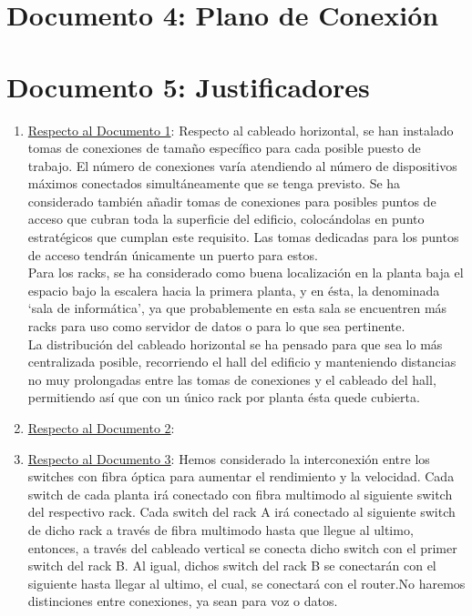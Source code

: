 \documentclass[]{article}
\begin{document}
\newpage

\section{Documento 4: Plano de Conexión}

\newpage

\section{Documento 5: Justificadores}

\begin{enumerate}[label=\alph*]
   \item \underline{Respecto al Documento 1}:
	Respecto al cableado horizontal, se han instalado tomas de conexiones de tamaño específico para cada posible puesto de trabajo. El número de conexiones varía atendiendo al número de dispositivos máximos conectados simultáneamente que se tenga previsto. Se ha considerado también añadir tomas de conexiones para posibles puntos de acceso que cubran toda la superficie del edificio, colocándolas en punto estratégicos que cumplan este requisito. Las tomas dedicadas para los puntos de acceso tendrán únicamente un puerto para estos. \\
	Para los racks, se ha  considerado como buena localización en la planta baja el espacio bajo la escalera hacia la primera planta, y en ésta, la denominada `sala de informática', ya que probablemente en esta sala se encuentren más racks para uso como servidor de datos o para lo que sea pertinente. \\
	La distribución del cableado horizontal se ha pensado para que sea lo más centralizada posible, recorriendo el hall del edificio y manteniendo distancias no muy prolongadas entre las tomas de conexiones y el cableado del hall, permitiendo así que con un único rack por planta ésta quede cubierta.
   \item \underline{Respecto al Documento 2}:
   \item \underline{Respecto al Documento 3}:
        Hemos considerado la interconexión entre los switches con fibra óptica para aumentar el rendimiento y la velocidad. Cada switch de cada planta irá conectado con fibra multimodo al siguiente switch del respectivo rack. Cada switch del rack A irá conectado al siguiente switch de dicho rack a través de fibra multimodo hasta que llegue al ultimo, entonces, a través del cableado vertical se conecta dicho switch con el primer switch del rack B. Al igual, dichos switch del rack B se conectarán con el siguiente hasta llegar al ultimo, el cual, se conectará con el router.No haremos distinciones entre conexiones, ya sean para voz o datos. \\

\end{enumerate}
\end{document}

